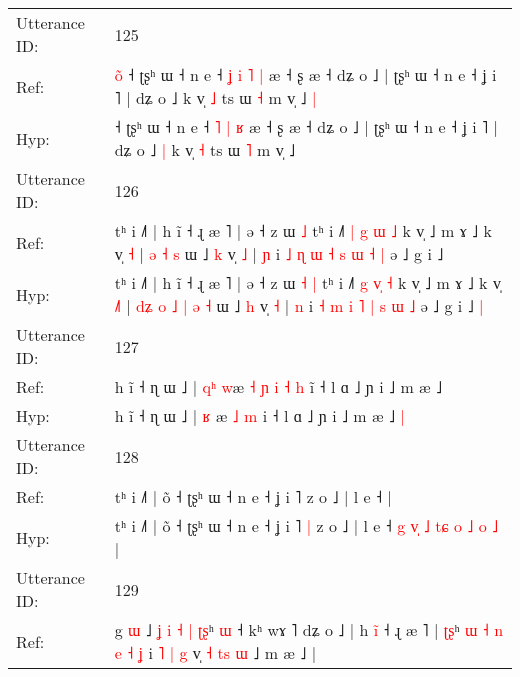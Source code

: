 \documentclass[10pt]{article}
\DeclareRobustCommand{\hl}[1]{{\textcolor{red}{#1}}}
\begin{document}
\begin{longtable}{ll}
 \\
\midrule
Utterance ID: & 125 \\
Ref: & \hl{o}\hl{̃}\hl{ }˧ ʈʂʰ ɯ ˧ n e ˧\hl{ }\hl{ʝ} \hl{i} \hl{˥} \hl{|} æ ˧ ʂ æ ˧ dʑ o ˩ | ʈʂʰ ɯ ˧ n e ˧ ʝ i ˥ | dʑ o ˩\hl{}\hl{} k v̩ \hl{˩} ts ɯ \hl{˧} m v̩ ˩\hl{ }\hl{|}
 \\
Hyp: & \hl{}\hl{}\hl{}˧ ʈʂʰ ɯ ˧ n e ˧\hl{}\hl{} \hl{˥} \hl{|} \hl{ʁ} æ ˧ ʂ æ ˧ dʑ o ˩ | ʈʂʰ ɯ ˧ n e ˧ ʝ i ˥ | dʑ o ˩\hl{ }\hl{|} k v̩ \hl{˧} ts ɯ \hl{˥} m v̩ ˩\hl{}\hl{}
 \\
\midrule
Utterance ID: & 126 \\
Ref: & tʰ i ˩˥ | h ĩ ˧ ɻ æ ˥ | ə ˧ z ɯ\hl{}\hl{} \hl{˩} tʰ i ˩˥ \hl{|} \hl{g}\hl{ }\hl{ɯ} \hl{˩} k v̩ ˩ m ɤ ˩ k v̩ \hl{}\hl{˧} |\hl{}\hl{}\hl{}\hl{}\hl{}\hl{}\hl{} \hl{ə} \hl{˧} \hl{s} ɯ ˩ \hl{k} v̩ \hl{˩} | \hl{ɲ} i \hl{˩} \hl{ɳ} \hl{ɯ} \hl{˧} \hl{s} \hl{ɯ} \hl{˧} \hl{|} ə ˩ g i ˩\hl{}\hl{}
 \\
Hyp: & tʰ i ˩˥ | h ĩ ˧ ɻ æ ˥ | ə ˧ z ɯ\hl{ }\hl{˧} \hl{|} tʰ i ˩˥ \hl{g} \hl{}\hl{v}\hl{̩} \hl{˧} k v̩ ˩ m ɤ ˩ k v̩ \hl{˩}\hl{˥} |\hl{ }\hl{d}\hl{ʑ}\hl{ }\hl{o}\hl{ }\hl{˩} \hl{|} \hl{ə} \hl{˧} ɯ ˩ \hl{h} v̩ \hl{˧} | \hl{n} i \hl{˧} \hl{m} \hl{i} \hl{˥} \hl{|} \hl{s} \hl{ɯ} \hl{˩} ə ˩ g i ˩\hl{ }\hl{|}
 \\
\midrule
Utterance ID: & 127 \\
Ref: & h ĩ ˧ ɳ ɯ ˩ | \hl{q}\hl{ʰ} \hl{w}æ\hl{ }\hl{˧}\hl{ }\hl{ɲ}\hl{ }\hl{i} \hl{˧} \hl{h} i\hl{̃} ˧ l ɑ ˩ ɲ i ˩ m æ ˩\hl{}\hl{}
 \\
Hyp: & h ĩ ˧ ɳ ɯ ˩ | \hl{}\hl{ʁ} \hl{}æ\hl{}\hl{}\hl{}\hl{}\hl{}\hl{} \hl{˩} \hl{m} i\hl{} ˧ l ɑ ˩ ɲ i ˩ m æ ˩\hl{ }\hl{|}
 \\
\midrule
Utterance ID: & 128 \\
Ref: & tʰ i ˩˥ | õ ˧ ʈʂʰ ɯ ˧ n e ˧ ʝ i ˥\hl{}\hl{} z o ˩ | l e ˧\hl{}\hl{}\hl{}\hl{}\hl{}\hl{}\hl{}\hl{}\hl{}\hl{}\hl{}\hl{}\hl{}\hl{}\hl{}\hl{}\hl{}\hl{} |
 \\
Hyp: & tʰ i ˩˥ | õ ˧ ʈʂʰ ɯ ˧ n e ˧ ʝ i ˥\hl{ }\hl{|} z o ˩ | l e ˧\hl{ }\hl{g}\hl{ }\hl{v}\hl{̩}\hl{ }\hl{˩}\hl{ }\hl{t}\hl{ɕ}\hl{ }\hl{o}\hl{ }\hl{˩}\hl{ }\hl{o}\hl{ }\hl{˩} |
 \\
\midrule
Utterance ID: & 129 \\
Ref: & g \hl{ɯ} ˩\hl{} \hl{ʝ} \hl{}\hl{i} \hl{˧} \hl{|} \hl{}\hl{ʈ}\hl{ʂ}ʰ \hl{}\hl{ɯ} ˧ kʰ wɤ ˥ dʑ o ˩ | h \hl{i}\hl{̃} ˧ ɻ æ ˥ | \hl{ʈ}\hl{ʂ}ʰ\hl{ }\hl{ɯ}\hl{ }\hl{˧}\hl{ }\hl{n}\hl{ }\hl{e}\hl{ }\hl{˧}\hl{ }\hl{ʝ} i\hl{ }\hl{˥} \hl{|} \hl{g} v̩\hl{ }\hl{˧}\hl{ }\hl{t}\hl{s}\hl{ }\hl{ɯ} ˩ m æ ˩ |
 \\

\end{longtable}
\end{document}
